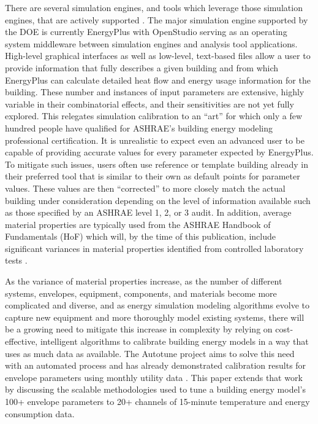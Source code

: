 \documentclass[preprint, review, 12pt]{elsarticle}
\begin{document}
There are several simulation engines, and tools which leverage those simulation engines, that are actively supported \cite{cit:doetools2012}. The major simulation engine supported by the DOE is currently EnergyPlus \cite{cit:energyplus} with OpenStudio \cite{cit:nrel2012} serving as an operating system middleware between simulation engines and analysis tool applications. High-level graphical interfaces as well as low-level, text-based files allow a user to provide information that fully describes a given building and from which EnergyPlus can calculate detailed heat flow and energy usage information for the building. These number and instances of input parameters are extensive, highly variable in their combinatorial effects, and their sensitivities are not yet fully explored. This relegates simulation calibration to an ``art'' for which only a few hundred people have qualified for ASHRAE's building energy modeling professional certification. It is unrealistic to expect even an advanced user to be capable of providing accurate values for every parameter expected by EnergyPlus. To mitigate such issues, users often use reference or template building already in their preferred tool that is similar to their own as default points for parameter values. These values are then ``corrected'' to more closely match the actual building under consideration depending on the level of information available such as those specified by an ASHRAE level 1, 2, or 3 audit. In addition, average material properties are typically used from the ASHRAE Handbook of Fundamentals (HoF) which will, by the time of this publication, include significant variances in material properties identified from controlled laboratory tests \cite{cit:ashrae2013}.

As the variance of material properties increase, as the number of different systems, envelopes, equipment, components, and materials become more complicated and diverse, and as energy simulation modeling algorithms evolve to capture new equipment and more thoroughly model existing systems, there will be a growing need to mitigate this increase in complexity by relying on cost-effective, intelligent algorithms to calibrate building energy models in a way that uses as much data as available. The Autotune project \cite{cit:new2012} aims to solve this need with an automated process and has already demonstrated calibration results for envelope parameters using monthly utility data \cite{cit:garrett2013}. This paper extends that work by discussing the scalable methodologies used to tune a building energy model's 100+ envelope parameters to 20+ channels of 15-minute temperature and energy consumption data.
\end{document}
